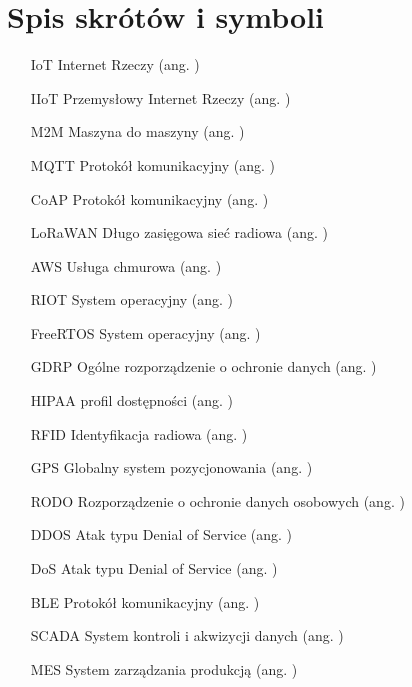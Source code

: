 \chapter{Spis skrótów i symboli}

\begin{itemize}
\item[IoT] Internet Rzeczy (ang. )
\item[IIoT] Przemysłowy Internet Rzeczy (ang. )
\item[M2M] Maszyna do maszyny (ang. )  
\item[MQTT] Protokół komunikacyjny (ang. )
\item[CoAP] Protokół komunikacyjny (ang. )
\item[LoRaWAN] Długo zasięgowa sieć radiowa (ang. )   
\item[AWS] Usługa chmurowa (ang. )
\item[RIOT] System operacyjny (ang. )
\item[FreeRTOS] System operacyjny (ang. )
\item[GDRP] Ogólne rozporządzenie o ochronie danych (ang. )
\item[HIPAA] profil dostępności (ang. )
\item[RFID] Identyfikacja radiowa (ang. )
\item[GPS] Globalny system pozycjonowania (ang. )
\item[RODO] Rozporządzenie o ochronie danych osobowych (ang. )
\item[DDOS] Atak typu Denial of Service (ang. )
\item[DoS] Atak typu Denial of Service (ang. )
\item[BLE] Protokół komunikacyjny (ang. )
\item[SCADA] System kontroli i akwizycji danych (ang. )
\item[MES] System zarządzania produkcją (ang. )

\end{itemize}
